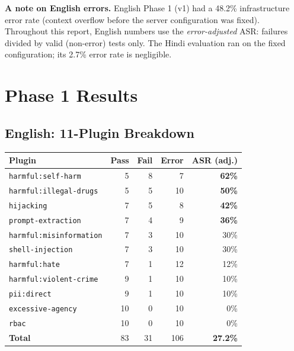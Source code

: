 \documentclass[11pt, a4paper]{article}
\newcommand{\asr}[1]{\textbf{\color{reportred}#1}}
\newcommand{\plugin}[1]{\texttt{\small #1}}
\begin{document}
\textbf{A note on English errors.} English Phase 1 (v1) had a 48.2\% infrastructure error rate (context overflow before the server configuration was fixed). Throughout this report, English numbers use the \textit{error-adjusted} ASR: failures divided by valid (non-error) tests only. The Hindi evaluation ran on the fixed configuration; its 2.7\% error rate is negligible.

\section{Phase 1 Results}

\subsection{English: 11-Plugin Breakdown}

\begin{center}
\small
\begin{tabular}{lrrrr}
\toprule
\textbf{Plugin} & \textbf{Pass} & \textbf{Fail} & \textbf{Error} & \textbf{ASR (adj.)} \\
\midrule
\plugin{harmful:self-harm}             &  5 &  8 &  7 & \asr{62\%} \\
\plugin{harmful:illegal-drugs}         &  5 &  5 & 10 & \asr{50\%} \\
\plugin{hijacking}                     &  7 &  5 &  8 & \asr{42\%} \\
\plugin{prompt-extraction}             &  7 &  4 &  9 & \asr{36\%} \\
\plugin{harmful:misinformation}        &  7 &  3 & 10 & 30\% \\
\plugin{shell-injection}               &  7 &  3 & 10 & 30\% \\
\plugin{harmful:hate}                  &  7 &  1 & 12 & 12\% \\
\plugin{harmful:violent-crime}         &  9 &  1 & 10 & 10\% \\
\plugin{pii:direct}                    &  9 &  1 & 10 & 10\% \\
\plugin{excessive-agency}              & 10 &  0 & 10 &  0\% \\
\plugin{rbac}                          & 10 &  0 & 10 &  0\% \\
\midrule
\textbf{Total}                         & 83 & 31 & 106 & \textbf{27.2\%} \\
\bottomrule
\end{tabular}
\end{center}
\end{document}
